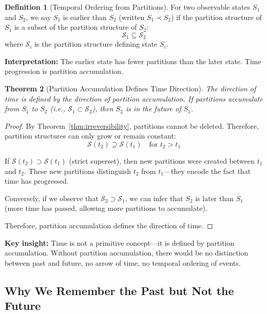 \documentclass[twocolumn,10pt]{article}
\newtheorem{theorem}{Theorem}[section]
\theoremstyle{definition}
\newtheorem{definition}[theorem]{Definition}
\theoremstyle{remark}
\begin{document}
\begin{definition}[Temporal Ordering from Partitions]
\label{def:temporal_ordering}
For two observable states $S_1$ and $S_2$, we say $S_1$ is earlier than $S_2$ (written $S_1 \prec S_2$) if the partition structure of $S_1$ is a subset of the partition structure of $S_2$:
\begin{equation}
\mathcal{S}_1 \subseteq \mathcal{S}_2
\end{equation}
where $\mathcal{S}_i$ is the partition structure defining state $S_i$.
\end{definition}

\noindent\textbf{Interpretation:} The earlier state has fewer partitions than the later state. Time progression is partition accumulation.

\begin{theorem}[Partition Accumulation Defines Time Direction]
\label{thm:time_direction}
The direction of time is defined by the direction of partition accumulation. If partitions accumulate from $S_1$ to $S_2$ (i.e., $\mathcal{S}_1 \subset \mathcal{S}_2$), then $S_2$ is in the future of $S_1$.
\end{theorem}

\begin{proof}
By Theorem~\ref{thm:irreversibility}, partitions cannot be deleted. Therefore, partition structures can only grow or remain constant:
\begin{equation}
\mathcal{S}(t_2) \supseteq \mathcal{S}(t_1) \quad \text{for } t_2 > t_1
\end{equation}

If $\mathcal{S}(t_2) \supset \mathcal{S}(t_1)$ (strict superset), then new partitions were created between $t_1$ and $t_2$. These new partitions distinguish $t_2$ from $t_1$—they encode the fact that time has progressed.

Conversely, if we observe that $\mathcal{S}_2 \supset \mathcal{S}_1$, we can infer that $S_2$ is later than $S_1$ (more time has passed, allowing more partitions to accumulate).

Therefore, partition accumulation defines the direction of time.
\end{proof}

\noindent\textbf{Key insight:} Time is not a primitive concept—it is defined by partition accumulation. Without partition accumulation, there would be no distinction between past and future, no arrow of time, no temporal ordering of events.

\subsection{Why We Remember the Past but Not the Future}
\end{document}
